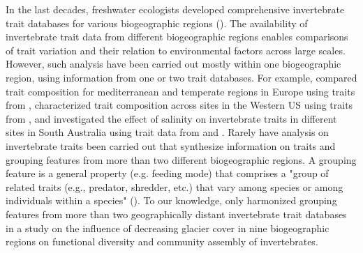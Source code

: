 \documentclass{article}
\begin{document}
In the last decades, freshwater ecologists developed comprehensive invertebrate trait databases for various biogeographic regions (\cite{usseglio-polatera_biomonitoring_2000, schmidt-kloiber_www.freshwaterecology.info_2015, vieira_database_nodate, Philips_and_Smith_NZ_DB_2018, kefford_integrated_2020, tomanova_trophic_2006}).
The availability of invertebrate trait data from different biogeographic regions enables comparisons of trait variation and their relation to environmental factors across large scales. However, such analysis have been carried out mostly within one biogeographic region, using information from one or two trait databases. For example, \cite{bonada_taxonomic_2007} compared trait composition for mediterranean and temperate regions in Europe using traits from \cite{usseglio-polatera_biomonitoring_2000}, \cite{poff_developing_2010} characterized trait composition across sites in the Western US using traits from \cite{poff_functional_2006}, and \cite{botwe_effects_2018} investigated the effect of salinity on invertebrate traits in different sites in South Australia using trait data from \cite{poff_functional_2006} and \cite{schafer_trait_2011}.
Rarely have analysis on invertebrate traits been carried out that synthesize information on traits and grouping features from more than two different biogeographic regions. A grouping feature is a general property (e.g. feeding mode) that comprises a "group of related traits (e.g., predator, shredder, etc.) that vary among species or among individuals within a species" (\cite{schmera_proposed_2015}). To our knowledge, only \cite{brown_functional_2018} harmonized grouping features from more than two geographically distant invertebrate trait databases in a study on the influence of decreasing glacier cover in nine biogeographic regions on functional diversity and community assembly of invertebrates. 
\end{document}
